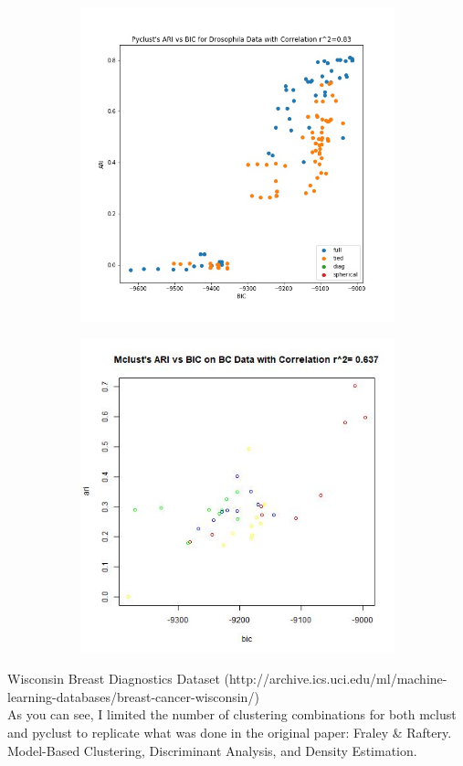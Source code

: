 \documentclass{article}
\begin{document}
\begin{figure}[h!]
\begin{subfigure}[b]{0.3\linewidth}
  \includegraphics[width=\linewidth]{python_bc_bicari.jpg}
\end{subfigure}
\begin{subfigure}[b]{0.3\linewidth}
  \includegraphics[width=\linewidth]{r_bc_bicari.jpg}
\end{subfigure} 
\end{figure}

\noindent Wisconsin Breast Diagnostics Dataset (http://archive.ics.uci.edu/ml/machine-learning-databases/breast-cancer-wisconsin/) \\
As you can see, I limited the number of clustering combinations for both mclust and pyclust to replicate what was done in the original paper: Fraley & Raftery. Model-Based Clustering, Discriminant Analysis, and Density Estimation.
\end{document}
